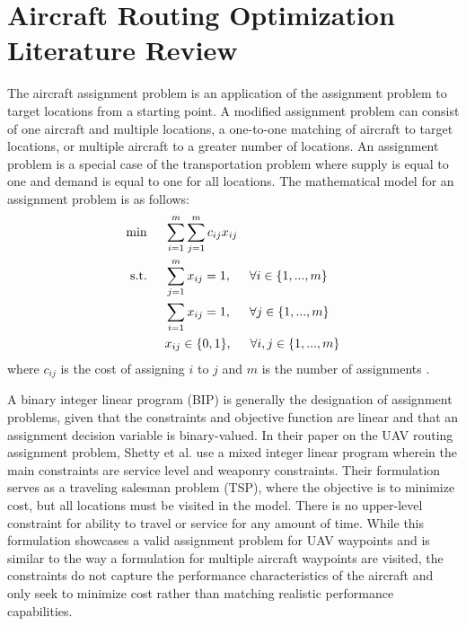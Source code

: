 \section{Aircraft Routing Optimization Literature Review}
The aircraft assignment problem is an application of the assignment problem to target locations from a starting point. A modified assignment problem can consist of one aircraft and multiple locations, a one-to-one matching of aircraft to target locations, or multiple aircraft to a greater number of locations. An assignment problem is a special case of the transportation problem where supply is equal to one and demand is equal to one for all locations. The mathematical model for an assignment problem is as follows:
\begin{align*}
    \min\hspace{0.5cm} &\sum_{i=1}^m\sum_{j = 1}^mc_{ij}x_{ij}\\
    \text{s.t.} \hspace{0.5cm} &\sum_{j=1}^mx_{ij} = 1, \hspace{0.5cm} \forall i \in \{1,...,m\}\\
    &\sum_{i=1}x_{ij} = 1, \hspace{0.5cm} \forall j \in \{1,...,m\}\\
    &x_{ij} \in \{0,1\}, \hspace{0.5cm} \forall i,j\in \{1,...,m\}
\end{align*}
where $c_{ij}$ is the cost of assigning $i$ to $j$ and $m$ is the number of assignments \cite{bazaraa}. 
\par
A binary integer linear program (BIP) is generally the designation of assignment problems, given that the constraints and objective function are linear and that an assignment decision variable is binary-valued. In their paper on the UAV routing assignment problem, Shetty et al. \cite{Shetty} use a mixed integer linear program wherein the main constraints are service level and weaponry constraints. Their formulation serves as a traveling salesman problem (TSP), where the objective is to minimize cost, but all locations must be visited in the model. There is no upper-level constraint for ability to travel or service for any amount of time. While this formulation showcases a valid assignment problem for UAV waypoints and is similar to the way a formulation for multiple aircraft waypoints are visited, the constraints do not capture the performance characteristics of the aircraft and only seek to minimize cost rather than matching realistic performance capabilities. \par
